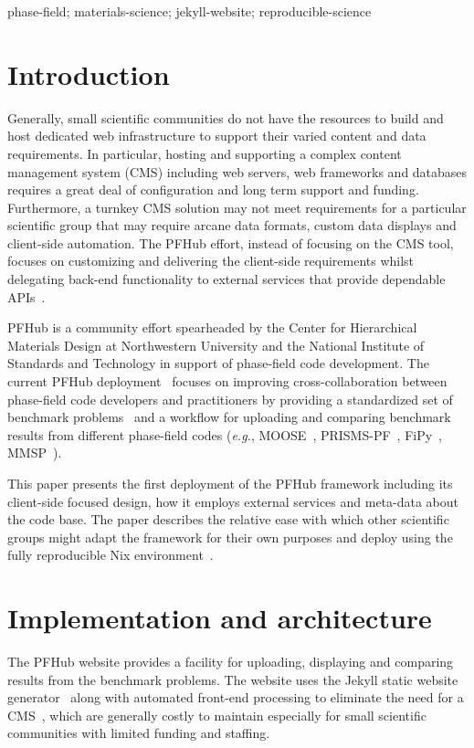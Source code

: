 \documentclass{jors}
\begin{document}
phase-field; materials-science; jekyll-website; reproducible-science

\section*{Introduction}

Generally, small scientific communities do not have the resources to
build and host dedicated web infrastructure to support their varied
content and data requirements. In particular, hosting and supporting a
complex content management system (CMS) including web servers, web
frameworks and databases requires a great deal of configuration and
long term support and funding. Furthermore, a turnkey CMS solution may
not meet requirements for a particular scientific group that may
require arcane data formats, custom data displays and client-side
automation. The PFHub effort, instead of focusing on the CMS tool,
focuses on customizing and delivering the client-side requirements
whilst delegating back-end functionality to external services that
provide dependable APIs~\cite{cmsfree}.

PFHub is a community effort spearheaded by the Center for Hierarchical
Materials Design at Northwestern University and the National Institute
of Standards and Technology in support of phase-field code
development. The current PFHub deployment~\cite{pfhub} focuses on
improving cross-collaboration between phase-field code developers and
practitioners by providing a standardized set of benchmark
problems~\cite{bm1, bm2} and a workflow for uploading and comparing
benchmark results from different phase-field codes (\emph{e.g.},
MOOSE~\cite{moose}, PRISMS-PF~\cite{prisms-pf}, FiPy~\cite{fipy},
MMSP~\cite{mmsp}).

This paper presents the first deployment of the PFHub framework
including its client-side focused design, how it employs external
services and meta-data about the code base. The paper describes the
relative ease with which other scientific groups might adapt the
framework for their own purposes and deploy using the fully
reproducible Nix environment~\cite{nix}.

\section*{Implementation and architecture}

The PFHub website provides a facility for uploading, displaying and
comparing results from the benchmark problems. The website uses the
Jekyll static website generator~\cite{jekyll} along with automated
front-end processing to eliminate the need for a CMS~\cite{cmsfree},
which are generally costly to maintain especially for small scientific
communities with limited funding and staffing.
\end{document}
